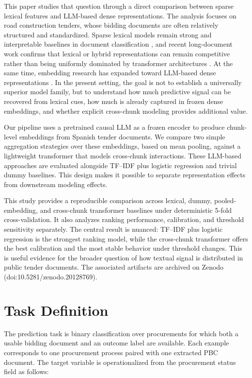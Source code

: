 \documentclass[conference]{IEEEtran}
\begin{document}
This paper studies that question through a direct comparison between sparse lexical features and LLM-based dense representations. The analysis focuses on road construction tenders, whose bidding documents are often relatively structured and standardized. Sparse lexical models remain strong and interpretable baselines in document classification \cite{wang2012baselines}, and recent long-document work confirms that lexical or hybrid representations can remain competitive rather than being uniformly dominated by transformer architectures \cite{alvaprincipe2025survey}. At the same time, embedding research has expanded toward LLM-based dense representations \cite{wang2024improvingembeddings}. In the present setting, the goal is not to establish a universally superior model family, but to understand how much predictive signal can be recovered from lexical cues, how much is already captured in frozen dense embeddings, and whether explicit cross-chunk modeling provides additional value.

Our pipeline uses a pretrained causal LLM as a frozen encoder to produce chunk-level embeddings from Spanish tender documents. We compare two simple aggregation strategies over these embeddings, based on mean pooling, against a lightweight transformer that models cross-chunk interactions. These LLM-based approaches are evaluated alongside TF--IDF plus logistic regression and trivial dummy baselines. This design makes it possible to separate representation effects from downstream modeling effects.

This study provides a reproducible comparison across lexical, dummy, pooled-embedding, and cross-chunk transformer baselines under deterministic 5-fold cross-validation. It also analyzes ranking performance, calibration, and threshold sensitivity separately. The central result is nuanced: TF--IDF plus logistic regression is the strongest ranking model, while the cross-chunk transformer offers the best calibration and the most stable behavior under threshold changes. This is useful evidence for the broader question of how textual signal is distributed in public tender documents. The associated artifacts are archived on Zenodo (doi:10.5281/zenodo.20128769).

\section{Task Definition}
The prediction task is binary classification over procurements for which both a usable bidding document and an outcome label are available. Each example corresponds to one procurement process paired with one extracted PBC document. The target variable is operationalized from the procurement status field as follows:
\end{document}
